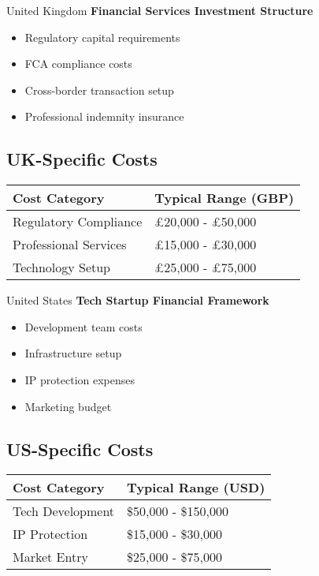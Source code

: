 \begin{regionalbox}{United Kingdom}
\textbf{Financial Services Investment Structure}
\begin{itemize}
    \item Regulatory capital requirements
    \item FCA compliance costs
    \item Cross-border transaction setup
    \item Professional indemnity insurance
\end{itemize}

\subsection{UK-Specific Costs}
\begin{center}
\begin{tabular}{p{}|p{}}
    \textbf{Cost Category} & \textbf{Typical Range (GBP)} \\
    \hline
    Regulatory Compliance & £20,000 - £50,000 \\
    Professional Services & £15,000 - £30,000 \\
    Technology Setup & £25,000 - £75,000 \\
\end{tabular}
\end{center}
\end{regionalbox}

\begin{regionalbox}{United States}
\textbf{Tech Startup Financial Framework}
\begin{itemize}
    \item Development team costs
    \item Infrastructure setup
    \item IP protection expenses
    \item Marketing budget
\end{itemize}

\subsection{US-Specific Costs}
\begin{center}
\begin{tabular}{p{}|p{}}
    \textbf{Cost Category} & \textbf{Typical Range (USD)} \\
    \hline
    Tech Development & \$50,000 - \$150,000 \\
    IP Protection & \$15,000 - \$30,000 \\
    Market Entry & \$25,000 - \$75,000 \\
\end{tabular}
\end{center}
\end{regionalbox}

